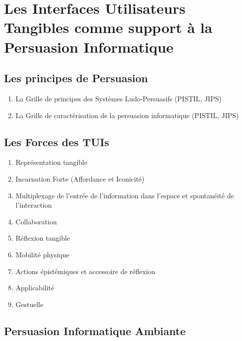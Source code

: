 \documentclass[10pt,a5paper,twoside]{article}
\begin{document}
\section{Les Interfaces Utilisateurs Tangibles comme support à la
Persuasion
Informatique}\label{les-interfaces-utilisateurs-tangibles-comme-support-uxe0-la-persuasion-informatique}

\subsection{Les principes de
Persuasion}\label{les-principes-de-persuasion}

\begin{enumerate}
\def\labelenumi{\arabic{enumi}.}
\itemsep1pt\parskip0pt
\item
  La Grille de principes des Systèmes Ludo-Persuasifs (PISTIL, JIPS)
\item
  La Grille de caractérisation de la persuasion informatique (PISTIL,
  JIPS)
\end{enumerate}

\subsection{Les Forces des TUIs}\label{les-forces-des-tuis}

\begin{enumerate}
\def\labelenumi{\arabic{enumi}.}
\itemsep1pt\parskip0pt
\item
  Représentation tangible
\item
  Incarnation Forte (Affordance et Iconicité)
\item
  Multiplexage de l'entrée de l'information dans l'espace et spontanéité
  de l'interaction
\item
  Collaboration
\item
  Réflexion tangible
\item
  Mobilité physique
\item
  Actions épistémiques et accessoire de réflexion
\item
  Applicabilité
\item
  Gestuelle
\end{enumerate}

\subsection{Persuasion Informatique
Ambiante}\label{persuasion-informatique-ambiante}
\end{document}
